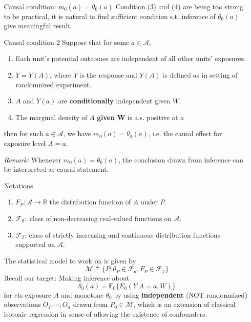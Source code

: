 \documentclass{beamer}
\newcommand{\defn}{\triangleq}
\newcommand{\E}{\mathbb{E}}
\newcommand{\bo}[1]{\boldsymbol{#1}}
\newcommand{\R}{\mathbb{R}}
\newcommand{\F}{\mathscr{F}}
\begin{document}
\begin{frame}{Causal condition: $m_0(a)=\theta_0(a)$}
Condition (3) and (4) are being too strong to be practical, it is natural to find sufficient condition s.t. inference of $\theta_0(a)$ give meaningful result.
	\begin{block}{Causal condition 2}
		Suppose that for some $a\in \mathcal{A}$,
		\begin{enumerate}
			\item Each unit's potential outcomes are independent of all other units' exposures.

			\item $Y=Y(A)$, where $Y$ is the response and $Y(A)$ is defined as in setting of randomnized experiment.

			\item $A$ and $Y(a)$ are \textbf{conditionally} independent given $W$.

			\item The marginal density of $A$ \textbf{given} $\bo{W}$ is a.s. positive at $a$
		\end{enumerate}
		then for such $a\in \mathcal{A}$, we have $m_0(a)=\theta_0(a)$, i.e. the causal effect for exposure level $A=a$.
	\end{block}
	\textit{
		Remark:
	} Whenever $m_0(a)=\theta_0(a)$, the conclusion drawn from inference can be interpreted as causal statement.
\end{frame}

\begin{frame}{Notations}
	\begin{enumerate}
		\item $F_P:\mathcal{A}\to\R$ the distribution function of $A$ under $P$.

		\item $\F_\theta:$ class of non-decreasing real-valued functions on $\mathcal{A}$.

		\item $\F_T$: class of strictly increasing and continuous distribution functions supported on $\mathcal{A}$.
	\end{enumerate}
	The statistical model to work on is given by
	$$
	\mathcal{M}\defn \big\{
	P:\theta_P\in\F_\theta,F_P\in\F_T
	\big\}
	$$
	Recall our target: Making inference about $$\theta_0(a)=\E_0\big\{E_0(Y|A=a,W) \big\}$$ for cts exposure $A$ and monotone $\theta_0$ by using \textbf{independent} (NOT randomnized) observations $O_1,\cdots,O_n$ drawn from $P_0\in\mathcal{M}$, which is an extension of classical isotonic regression in sense of allowing the existence of confounders.
\end{frame}
\end{document}
